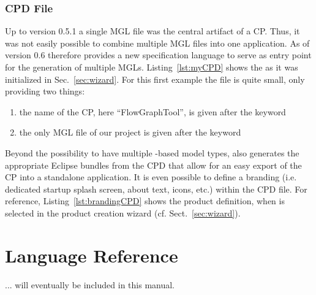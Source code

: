 \documentclass[a4paper,american,12pt]{scrreprt}
\begin{document}
\subsection{CPD File}
Up to \cinco version 0.5.1 a single MGL file was the central artifact of a CP. Thus,
it was not easily possible to combine multiple MGL files into one
application\footnotemark{}. As of version 0.6 \cinco therefore provides a new
%
%
%
specification language to serve as entry point for the generation of multiple
MGLs. Listing~\ref{lst:myCPD} shows the  as it was
initialized in Sec.~\ref{sec:wizard}. For this first example the file is
quite small, only providing two things:

\begin{enumerate}
\item the name of the CP, here ``FlowGraphTool'', is given after the
 keyword
\item the only MGL file of our project is given after the  keyword
\end{enumerate}


Beyond the possibility to have multiple \cinco{}-based model types, \cinco{}
also generates the appropriate Eclipse bundles from the CPD that allow for an
easy export of the CP into a standalone application.  It is even possible to
define a branding (i.e. dedicated startup splash screen, about text, icons,
etc.) within the CPD file. For reference, Listing~\ref{lst:brandingCPD} shows
the product definition, when  is selected in the \cinco{}
product creation wizard (cf. Sect.~\ref{sec:wizard}).






\chapter{Language Reference}

... will eventually be included in this manual.
\end{document}
